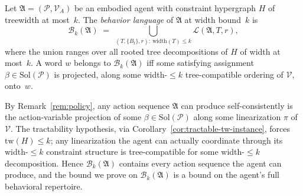 \documentclass[runningheads]{llncs}
\begin{document}
\begin{definition}\label{def:full-behavior-language}
Let $\mathfrak{A} = (\mathcal{P}, \mathcal{V}_A)$ be an embodied agent with constraint hypergraph $H$ of treewidth at most~$k$. The \emph{behavior language} of $\mathfrak{A}$ at width bound~$k$ is
\[
  \mathcal{B}_k(\mathfrak{A}) \;=\; \bigcup_{(T, \{B_t\}, r):\ \mathrm{width}(T) \leq k} \mathcal{L}(\mathfrak{A}, T, r),
\]
where the union ranges over all rooted tree decompositions of $H$ of width at most~$k$. A word $w$ belongs to $\mathcal{B}_k(\mathfrak{A})$ iff some satisfying assignment $\beta \in \mathrm{Sol}(\mathcal{P})$ is projected, along some width-$\leq k$ tree-compatible ordering of $\mathcal{V}$, onto~$w$.
\end{definition}

\begin{remark}\label{rem:full-behavior-scope}
By Remark~\ref{rem:policy}, any action sequence $\mathfrak{A}$ can produce self-consistently is the action-variable projection of some $\beta \in \mathrm{Sol}(\mathcal{P})$ along some linearization $\pi$ of $\mathcal{V}$. The tractability hypothesis, via Corollary~\ref{cor:tractable-tw-instance}, forces $\mathrm{tw}(H) \leq k$; any linearization the agent can actually coordinate through its width-$\leq k$ constraint structure is tree-compatible for some width-$\leq k$ decomposition. Hence $\mathcal{B}_k(\mathfrak{A})$ contains every action sequence the agent can produce, and the bound we prove on $\mathcal{B}_k(\mathfrak{A})$ is a bound on the agent's full behavioral repertoire.
\end{remark}
\end{document}
